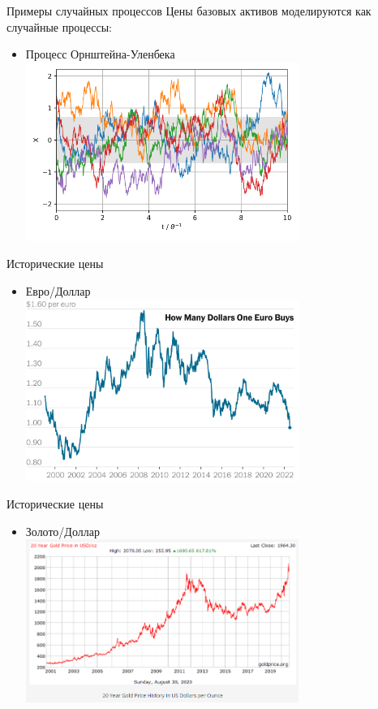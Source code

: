\documentclass{beamer}
\begin{document}
    \begin{frame}{Примеры случайных процессов}
        Цены базовых активов моделируются как случайные процессы:
        \begin{itemize}
            \item Процесс Орнштейна-Уленбека\\
            \includegraphics[width=0.7\textwidth]{Ornstein-Uhlenbeck-5traces.svg.png}
        \end{itemize}
    \end{frame}

    \begin{frame}{Исторические цены}
        \begin{itemize}
            \item Евро/Доллар\\
            \includegraphics[width=0.7\textwidth]{euro-dollar-parity-alt-promo-superJumbo.jpg}
        \end{itemize}
    \end{frame}

    \begin{frame}{Исторические цены}
        \begin{itemize}
            \item Золото/Доллар\\
            \includegraphics[width=0.7\textwidth]{gold-20y.png}
        \end{itemize}
    \end{frame}
\end{document}
